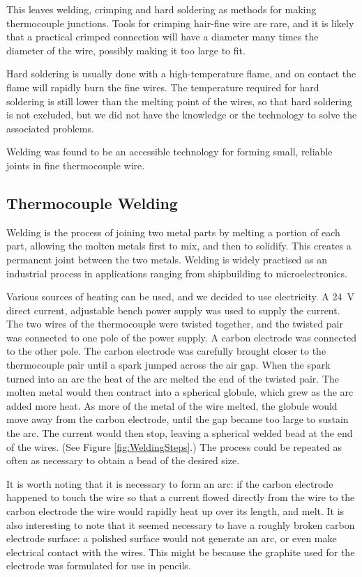 This leaves welding, crimping and hard soldering as methods for making
thermocouple junctions. Tools for crimping hair-fine wire are rare, and it is
likely that a practical crimped connection will have a diameter many times the
diameter of the wire, possibly making it too large to fit. 

Hard soldering is usually done with a high-temperature flame, and on contact the
flame will rapidly burn the fine wires. The temperature required for hard
soldering is still lower than the melting point of the wires, so that hard
soldering is not excluded, but we did not have the knowledge or the technology
to solve the associated problems.

Welding was found to be an accessible technology for forming small, reliable
joints in fine thermocouple wire.

\subsection{Thermocouple Welding}

Welding is the process of joining two metal parts by melting a portion of each
part, allowing the molten metals first to mix, and then to solidify. This
creates a permanent joint between the two metals. Welding is widely practised as
an industrial process in applications ranging from shipbuilding to
microelectronics.

Various sources of heating can be used, and we decided to use electricity. A
\SI{24}{\volt} direct current, adjustable bench power supply was used to supply
the current. The two wires of the thermocouple were twisted together, and the
twisted pair was connected to one pole of the power supply. A carbon electrode
was connected to the other pole. The carbon electrode was carefully brought
closer to the thermocouple pair until a spark jumped across the air gap. When
the spark turned into an arc the heat of the arc melted the end of the twisted
pair. The molten metal would then contract into a spherical globule, which grew
as the arc added more heat. As more of the metal of the wire melted, the globule
would move away from the carbon electrode, until the gap became too large to
sustain the arc. The current would then stop, leaving a spherical welded bead at
the end of the wires. (See Figure \ref{fig:WeldingSteps}.) The process could be
repeated as often as necessary to obtain a bead of the desired size.

It is worth noting that it is necessary to form an arc: if the carbon
electrode happened to touch the wire so that a current flowed directly from the
wire to the carbon electrode the wire would rapidly heat up over its length, and
melt. It is also interesting to note that it seemed necessary to have a roughly
broken carbon electrode surface: a polished surface would not generate an arc,
or even make electrical contact with the wires. This might be because the
graphite used for the electrode was formulated for use in pencils.

